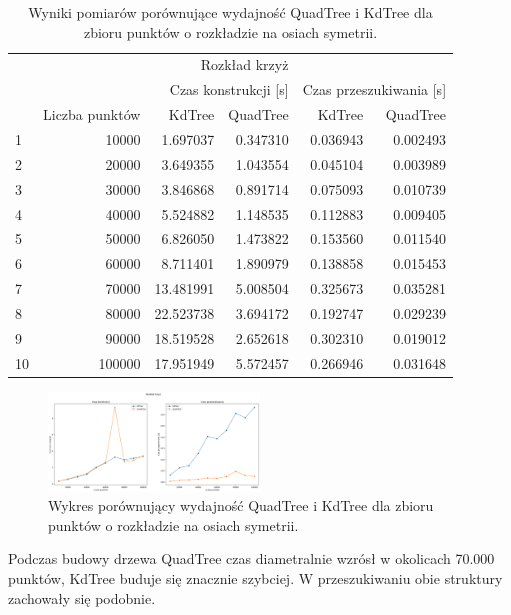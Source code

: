 \documentclass{lab}
\begin{document}
\begin{table}[H]
\centering
\begin{tabular}{lrrrrr}
  \toprule
   & \multicolumn{5}{c}{Rozkład krzyż} \\
   &  & \multicolumn{2}{r}{Czas konstrukcji [s]} & \multicolumn{2}{r}{Czas przeszukiwania [s]} \\
   & Liczba punktów & KdTree & QuadTree & KdTree & QuadTree \\
  \midrule
  1 & 10000 & 1.697037 & 0.347310 & 0.036943 & 0.002493 \\
  2 & 20000 & 3.649355 & 1.043554 & 0.045104 & 0.003989 \\
  3 & 30000 & 3.846868 & 0.891714 & 0.075093 & 0.010739 \\
  4 & 40000 & 5.524882 & 1.148535 & 0.112883 & 0.009405 \\
  5 & 50000 & 6.826050 & 1.473822 & 0.153560 & 0.011540 \\
  6 & 60000 & 8.711401 & 1.890979 & 0.138858 & 0.015453 \\
  7 & 70000 & 13.481991 & 5.008504 & 0.325673 & 0.035281 \\
  8 & 80000 & 22.523738 & 3.694172 & 0.192747 & 0.029239 \\
  9 & 90000 & 18.519528 & 2.652618 & 0.302310 & 0.019012 \\
  10 & 100000 & 17.951949 & 5.572457 & 0.266946 & 0.031648 \\
  \bottomrule
  \end{tabular}
\caption{Wyniki pomiarów porównujące wydajność QuadTree i KdTree dla zbioru punktów o rozkładzie na osiach symetrii.}
\label{tab:cross_time}
\end{table}

\begin{figure}[H]
  \centering
  \includegraphics[width=0.5\textwidth]{resources/cross_graph.png}
  \caption{Wykres porównujący wydajność QuadTree i KdTree dla zbioru punktów o rozkładzie na osiach symetrii.}
  \label{fig:cross_graph}
\end{figure}

Podczas budowy drzewa QuadTree czas diametralnie wzrósł w okolicach 70.000 punktów, KdTree buduje się znacznie szybciej. W przeszukiwaniu obie struktury zachowały się podobnie.
\end{document}
